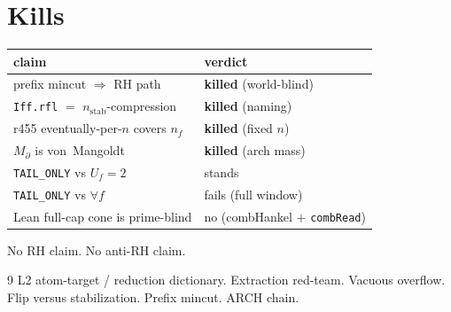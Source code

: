 \documentclass[11pt]{article}
\theoremstyle{remark}
\newcommand{\nf}{n_f}
\begin{document}
\section{Kills}\label{sec:kill}

\begin{center}
\small
\begin{tabular}{@{}ll@{}}
\toprule
claim & verdict \\
\midrule
prefix mincut $\Rightarrow$ RH path & \textbf{killed} (world-blind) \\
\texttt{Iff.rfl} $=$ $n_{\mathrm{stab}}$-compression & \textbf{killed} (naming) \\
r455 eventually-per-$n$ covers $\nf$ & \textbf{killed} (fixed $n$) \\
$M_{\partial}$ is von~Mangoldt & \textbf{killed} (arch mass) \\
\texttt{TAIL\_ONLY} vs $U_f=2$ & stands \\
\texttt{TAIL\_ONLY} vs $\forall f$ & fails (full window) \\
Lean full-cap cone is prime-blind & no (combHankel $+$ \texttt{combRead}) \\
\bottomrule
\end{tabular}
\end{center}

No RH claim.  No anti-RH claim.

\begin{thebibliography}{9}
 L2 atom-target / reduction dictionary.
 Extraction red-team.
 Vacuous overflow.
 Flip versus stabilization.
 Prefix mincut.
 ARCH chain.
\end{thebibliography}
\end{document}
